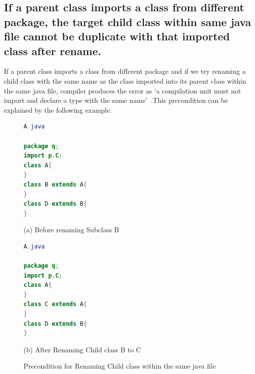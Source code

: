 \subsection{If a parent class imports a class from different package, the target child class within same java file cannot be duplicate with that imported class after rename.}

If a parent class imports a class from different package and if we try renaming a child class with the same name as the class imported into its parent class within the same java file, compiler produces the error as `a compilation unit must not import and declare a type with the same name'~\cite{EclipseWebPage}.This precondition can be explained by the following example.

\begin{figure}[th]
\centering
\begin{minipage}[t]{0.45\linewidth}
\begin{lstlisting}[language=java, basicstyle=\scriptsize\ttfamily,frame=single]	
A.java

package q;
import p.C;
class A{	
}
class B extends A{	
}
class D extends B{
}
\end{lstlisting}
\tiny{(a) Before renaming Subclass B}
\end{minipage}
\hfill
\begin{minipage}[t]{0.45\linewidth}
\begin{lstlisting}[language=java, basicstyle=\scriptsize\ttfamily,frame=single]
A.java

package q;
import p.C;
class A{	
}
class C extends A{	
}
class D extends B{
}	
\end{lstlisting}
\tiny{(b) After Renaming Child class  B to C}
\end{minipage}
\caption{Precondition for Renaming Child class within the same java file}
\label{figure:fig7}
\end{figure}

